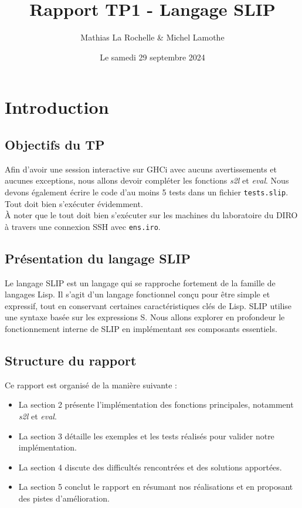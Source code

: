 \documentclass{article}
\title{Rapport TP1 - Langage SLIP}
\author{Mathias La Rochelle \& Michel Lamothe}
\date{Le samedi 29 septembre 2024}
\begin{document}
\maketitle
\setlength{\parindent}{0pt}


\section{Introduction}
\subsection{Objectifs du TP}
Afin d'avoir une session interactive sur GHCi avec aucuns avertissements et aucunes exceptions, nous allons devoir compléter les fonctions \textit{s2l} et \textit{eval}. Nous devons également écrire le code d'au moins 5 tests dans un fichier \texttt{tests.slip}. Tout doit bien s'exécuter évidemment. \\

\noindent À noter que le tout doit bien s'exécuter sur les machines du laboratoire du DIRO à travers une connexion SSH avec \texttt{ens.iro}.

\subsection{Présentation du langage SLIP}
Le langage SLIP est un langage qui se rapproche fortement de la famille de langages Lisp. Il s'agit d'un langage fonctionnel conçu pour être simple et expressif, tout en conservant certaines caractéristiques clés de Lisp. SLIP utilise une syntaxe basée sur les expressions S. Nous allons explorer en profondeur le fonctionnement interne de SLIP en implémentant ses composants essentiels.

\subsection{Structure du rapport}
Ce rapport est organisé de la manière suivante :
\begin{itemize}
    \item La section 2 présente l'implémentation des fonctions principales, notamment \textit{s2l} et \textit{eval}.
    \item La section 3 détaille les exemples et les tests réalisés pour valider notre implémentation.
    \item La section 4 discute des difficultés rencontrées et des solutions apportées.
    \item La section 5 conclut le rapport en résumant nos réalisations et en proposant des pistes d'amélioration.
\end{itemize}
\end{document}
